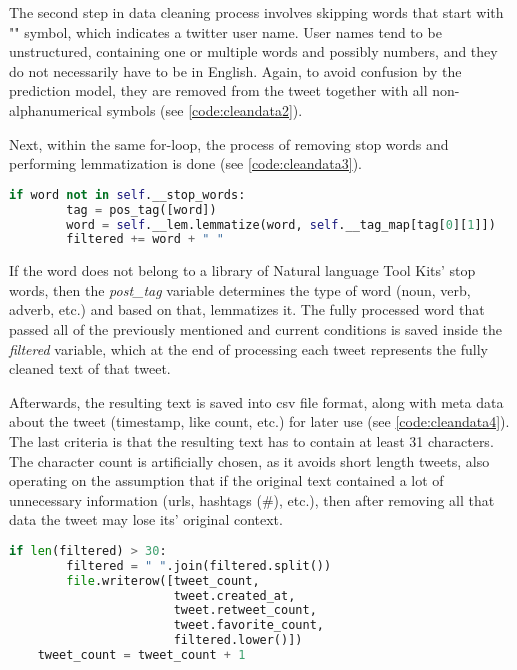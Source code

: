             The second step in data cleaning process involves skipping words that start with "\@" symbol, which indicates a twitter user name. User names tend to be unstructured, containing one or multiple words and possibly numbers, and they do not necessarily have to be in English. Again, to avoid confusion by the prediction model, they are removed from the tweet together with all non-alphanumerical symbols (see \cref{code:cleandata2}).
            
            Next, within the same for-loop, the process of removing stop words and performing lemmatization is done (see \cref{code:cleandata3}).
            
            \begin{lstlisting}[language=Python, caption=Cleaning of Data (Part 3), label=code:cleandata3]
    if word not in self.__stop_words:
        tag = pos_tag([word])
        word = self.__lem.lemmatize(word, self.__tag_map[tag[0][1]])
        filtered += word + " "
            \end{lstlisting}
            \FloatBarrier
            
            If the word does not belong to a library of Natural language Tool Kits' stop words, then the \textit{post\_tag} variable determines the type of word (noun, verb, adverb, etc.) and based on that, lemmatizes it. The fully processed word that passed all of the previously mentioned and current conditions is saved inside the \textit{filtered} variable, which at the end of processing each tweet represents the fully cleaned text of that tweet.
            
            Afterwards, the resulting text is saved into \gls{csv} file format, along with meta data about the tweet (timestamp, like count, etc.) for later use (see \cref{code:cleandata4}). The last criteria is that the resulting text has to contain at least 31 characters. The character count is artificially chosen, as it avoids short length tweets, also operating on the assumption that if the original text contained a lot of unnecessary information (\gls{url}s, hashtags (\#), etc.), then after removing all that data the tweet may lose its' original context. 
            
            \begin{lstlisting}[language=Python, caption=Cleaning of Data (part 4), label=code:cleandata4]
    if len(filtered) > 30:
        filtered = " ".join(filtered.split())
        file.writerow([tweet_count,
                       tweet.created_at,
                       tweet.retweet_count,
                       tweet.favorite_count,
                       filtered.lower()])
    tweet_count = tweet_count + 1
            \end{lstlisting}
            \FloatBarrier
            
